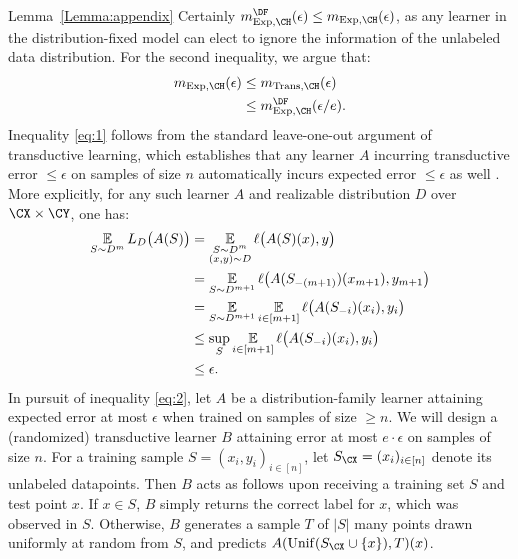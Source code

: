 \documentclass[11pt]{article}
\begin{document}
\begin{proofof}{Lemma~\ref{Lemma:appendix}}
Certainly $m_{\Exp, \CH}^{\DF}(\epsilon) \leq m_{\Exp, \CH}(\epsilon)$, as any learner in the distribution-fixed model can elect to ignore the information of the unlabeled data distribution. For the second inequality, we argue that: 
\begin{align}
m_{\Exp, \CH}(\epsilon) &\leq m_{\Trans, \CH}(\epsilon) \label{eq:1} \\
&\leq m_{\Exp, \CH}^{\DF}(\epsilon / e). \label{eq:2}
\end{align}
Inequality \eqref{eq:1} follows from the standard leave-one-out argument of transductive learning, which establishes that any learner $A$ incurring transductive error $\leq \epsilon$ on samples of size $n$ automatically incurs expected error $\leq \epsilon$ as well \citep{haussler1994predicting}. More explicitly, for any such learner $A$ and realizable distribution $D$ over $\CX \times \CY$, one has: 
\begin{align*}
\operatorname*{\mathbb{E}}_{S \sim D^m} L_D\big(A(S)\big) &= \operatorname*{\mathbb{E}}_{\substack{S \sim D^m \\ (x, y) \sim D}} \ell \big(A(S)(x), y \big) \\ 
&= \operatorname*{\mathbb{E}}_{S \sim D^{m+1}} \ell \big(A(S_{-(m+1)})(x_{m+1}), y_{m+1} \big) \\
&= \operatorname*{\mathbb{E}}_{S \sim D^{m+1}} \operatorname*{\mathbb{E}}_{i \in [m+1]} \ell \big( A(S_{-i})(x_{i}), y_{i} \big) \\ 
&\leq \sup_{S} \operatorname*{\mathbb{E}}_{i \in [m+1]} \ell \big( A(S_{-i})(x_{i}), y_{i} \big) \\
&\leq \epsilon. 
\end{align*}
In pursuit of inequality \eqref{eq:2}, let $A$ be a distribution-family learner attaining expected error at most $ \epsilon$ when trained on samples of size $\geq n$. We will design a (randomized) transductive learner $B$ attaining error at most $e \cdot \epsilon$ on samples of size $n$. For a training sample $S = (x_i, y_i)_{i \in [n]}$, let $S_{\CX} = (x_i)_{i \in [n]}$ denote its unlabeled datapoints.
Then $B$ acts as follows upon receiving a training set $S$ and test point $x$. If $x \in S$, $B$ simply returns the correct label for $x$, which was observed in $S$. Otherwise, $B$ generates a sample $T$ of $|S|$ many points drawn uniformly at random from $S$, and predicts $A(\Unif(S_{\CX} \cup \{x\}), T)(x)$. 


\end{proofof}
\end{document}
